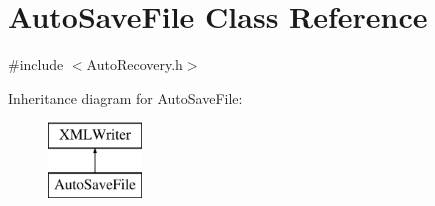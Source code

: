 \hypertarget{class_auto_save_file}{}\section{Auto\+Save\+File Class Reference}
\label{class_auto_save_file}


{\ttfamily \#include $<$Auto\+Recovery.\+h$>$}

Inheritance diagram for Auto\+Save\+File\+:\begin{figure}[H]
\begin{center}
\leavevmode
\includegraphics[height=2.000000cm]{class_auto_save_file}
\end{center}
\end{figure}
